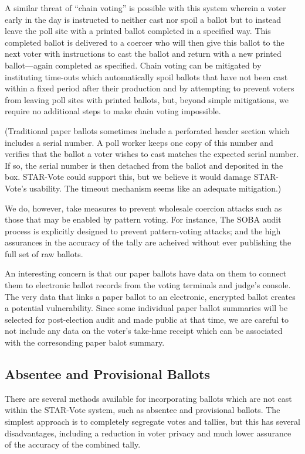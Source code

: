 \documentclass[letterpaper, 10pt, twocolumn]{article}
\newcommand{\projname}{STAR-Vote\xspace}
\begin{document}
A similar threat of ``chain voting'' is possible with this system wherein a voter early in the day is instructed to neither cast nor spoil a ballot but to instead leave the poll site with a printed ballot completed in a specified way.  This completed ballot is delivered to a coercer who will then give this ballot to the next voter with instructions to cast the ballot and return with a new printed ballot---again completed as specified.  Chain voting can be mitigated by instituting time-outs which automatically spoil ballots that have not been cast within a fixed period after their production and by attempting to prevent voters from leaving poll sites with printed ballots, but, beyond simple mitigations, we require no additional steps to make chain voting impossible. 

(Traditional paper ballots sometimes include a perforated header section which includes a serial number. A poll worker keeps one copy of this number and verifies that the ballot a voter wishes to cast matches the expected serial number. If so, the serial number is then detached from the ballot and deposited in the box. \projname could support this, but we believe it would damage \projname's usability. The timeout mechanism seems like an adequate mitigation.)

We do, however, take measures to prevent wholesale coercion attacks such as those that may be enabled by pattern voting.  For instance, The SOBA audit process is explicitly designed to prevent pattern-voting attacks; and the high assurances in the accuracy of the tally are acheived without ever publishing the full set of raw ballots.



An interesting concern is that our paper ballots have data on them to connect them to electronic ballot records from the voting terminals and judge's console. The very data that links a paper ballot to an electronic, encrypted ballot creates a potential vulnerability. Since some individual paper ballot summaries will be selected for post-election audit and made public at that time, we are careful to not include any data on the voter's take-hme receipt which can be associated with the corresonding paper balot summary.







\subsection{Absentee and Provisional Ballots}
There are several methods available for incorporating ballots which are not cast within the \projname system, such as absentee and provisional ballots.  The simplest approach is to completely segregate votes and tallies, but this has several disadvantages, including a reduction in voter privacy and much lower assurance of the accuracy of the combined tally.
\end{document}
